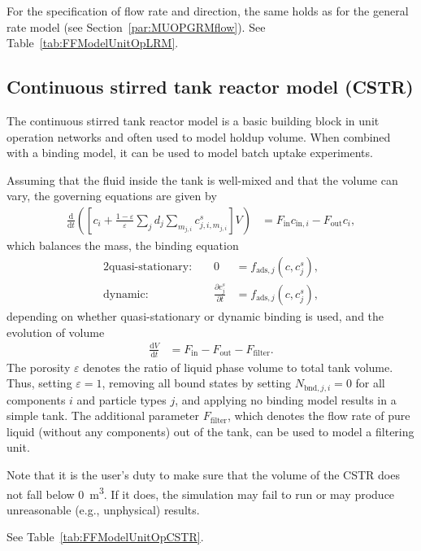 For the specification of flow rate and direction, the same holds as for the general rate model (see Section~\ref{par:MUOPGRMflow}).
See Table~\ref{tab:FFModelUnitOpLRM}.

\subsection{Continuous stirred tank reactor model (CSTR)}\label{sec:MUOPCSTR}

The continuous stirred tank reactor model  is a basic building block in unit operation networks and often used to model holdup volume.
When combined with a binding model, it can be used to model batch uptake experiments.

Assuming that the fluid inside the tank is well-mixed and that the volume can vary, the governing equations are given by
\begin{align*}
	\frac{\mathrm{d}}{\mathrm{d}t} \left(\left[ c_i + \frac{1-\varepsilon}{\varepsilon} \sum_j d_j \sum_{m_{j,i}} c^s_{j,i,m_{j,i}} \right] V\right) &= F_{\text{in}} c_{\text{in},i} - F_{\text{out}} c_i,
\end{align*}
which balances the mass, the binding equation
\begin{alignat*}{2}
	\text{quasi-stationary: }& & 0 &= f_{\text{ads},j}\left( c, c^s_j\right), \\
	\text{dynamic: }& & \frac{\partial c^s_j}{\partial t} &= f_{\text{ads},j}\left( c, c^s_j\right),
\end{alignat*}
depending on whether quasi-stationary or dynamic binding is used, and the evolution of volume
\begin{align*}
	\frac{\mathrm{d}V}{\mathrm{d}t} &= F_{\text{in}} - F_{\text{out}} - F_{\text{filter}}.
\end{align*}
The porosity $\varepsilon$ denotes the ratio of liquid phase volume to total tank volume.
Thus, setting $\varepsilon = 1$, removing all bound states by setting $N_{\text{bnd},j,i} = 0$ for all components $i$ and particle types $j$, and applying no binding model results in a simple tank.
The additional parameter $F_{\text{filter}}$, which denotes the flow rate of pure liquid (without any components) out of the tank, can be used to model a filtering unit.

Note that it is the user's duty to make sure that the volume of the CSTR does not fall below \SI{0}{\cubic\metre}.
If it does, the simulation may fail to run or may produce unreasonable (e.g., unphysical) results.

See Table~\ref{tab:FFModelUnitOpCSTR}.
